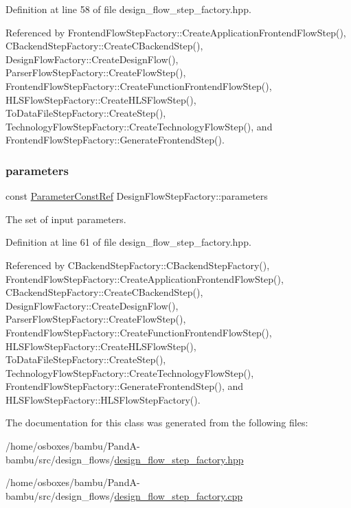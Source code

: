 Definition at line 58 of file design\+\_\+flow\+\_\+step\+\_\+factory.\+hpp.



Referenced by Frontend\+Flow\+Step\+Factory\+::\+Create\+Application\+Frontend\+Flow\+Step(), C\+Backend\+Step\+Factory\+::\+Create\+C\+Backend\+Step(), Design\+Flow\+Factory\+::\+Create\+Design\+Flow(), Parser\+Flow\+Step\+Factory\+::\+Create\+Flow\+Step(), Frontend\+Flow\+Step\+Factory\+::\+Create\+Function\+Frontend\+Flow\+Step(), H\+L\+S\+Flow\+Step\+Factory\+::\+Create\+H\+L\+S\+Flow\+Step(), To\+Data\+File\+Step\+Factory\+::\+Create\+Step(), Technology\+Flow\+Step\+Factory\+::\+Create\+Technology\+Flow\+Step(), and Frontend\+Flow\+Step\+Factory\+::\+Generate\+Frontend\+Step().

\mbox{\label{classDesignFlowStepFactory_ab2c8bba23db9f4066e1a27ee7157c2de}} 
\subsubsection{\texorpdfstring{parameters}{parameters}}
{\footnotesize\ttfamily const \hyperlink{Parameter_8hpp_a37841774a6fcb479b597fdf8955eb4ea}{Parameter\+Const\+Ref} Design\+Flow\+Step\+Factory\+::parameters\hspace{0.3cm}{\ttfamily [protected]}}



The set of input parameters. 



Definition at line 61 of file design\+\_\+flow\+\_\+step\+\_\+factory.\+hpp.



Referenced by C\+Backend\+Step\+Factory\+::\+C\+Backend\+Step\+Factory(), Frontend\+Flow\+Step\+Factory\+::\+Create\+Application\+Frontend\+Flow\+Step(), C\+Backend\+Step\+Factory\+::\+Create\+C\+Backend\+Step(), Design\+Flow\+Factory\+::\+Create\+Design\+Flow(), Parser\+Flow\+Step\+Factory\+::\+Create\+Flow\+Step(), Frontend\+Flow\+Step\+Factory\+::\+Create\+Function\+Frontend\+Flow\+Step(), H\+L\+S\+Flow\+Step\+Factory\+::\+Create\+H\+L\+S\+Flow\+Step(), To\+Data\+File\+Step\+Factory\+::\+Create\+Step(), Technology\+Flow\+Step\+Factory\+::\+Create\+Technology\+Flow\+Step(), Frontend\+Flow\+Step\+Factory\+::\+Generate\+Frontend\+Step(), and H\+L\+S\+Flow\+Step\+Factory\+::\+H\+L\+S\+Flow\+Step\+Factory().



The documentation for this class was generated from the following files\+:\begin{DoxyCompactItemize}
\item 
/home/osboxes/bambu/\+Pand\+A-\/bambu/src/design\+\_\+flows/\hyperlink{design__flow__step__factory_8hpp}{design\+\_\+flow\+\_\+step\+\_\+factory.\+hpp}\item 
/home/osboxes/bambu/\+Pand\+A-\/bambu/src/design\+\_\+flows/\hyperlink{design__flow__step__factory_8cpp}{design\+\_\+flow\+\_\+step\+\_\+factory.\+cpp}\end{DoxyCompactItemize}
